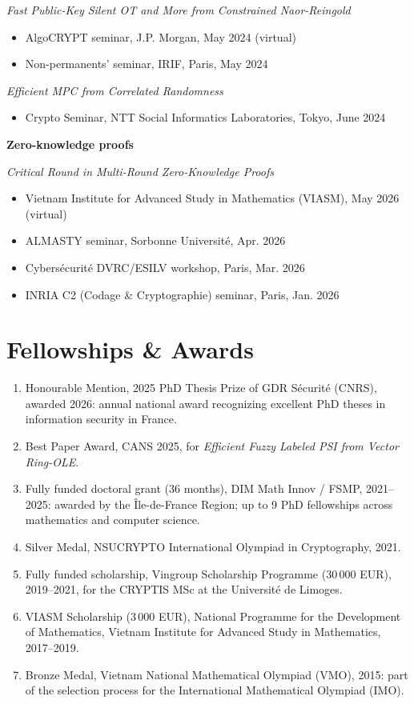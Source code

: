 \documentclass[11pt]{article}
\begin{document}
\smallskip
\emph{Fast Public-Key Silent OT and More from Constrained Naor-Reingold}
\begin{itemize}
      \item AlgoCRYPT seminar, J.P. Morgan, May 2024 (virtual)
      \item Non-permanents' seminar, IRIF, Paris, May 2024
\end{itemize}

\smallskip
\emph{Efficient MPC from Correlated Randomness}
\begin{itemize}
      \item Crypto Seminar, NTT Social Informatics Laboratories, Tokyo, June 2024
\end{itemize}

\medskip
\textbf{Zero-knowledge proofs}

\smallskip
\emph{Critical Round in Multi-Round Zero-Knowledge Proofs}
\begin{itemize}
      \item Vietnam Institute for Advanced Study in Mathematics (VIASM), May 2026 (virtual)
      \item ALMASTY seminar, Sorbonne Universit\'e, Apr. 2026
      \item Cybers\'ecurit\'e DVRC/ESILV workshop, Paris, Mar. 2026
      \item INRIA C2 (Codage \& Cryptographie) seminar, Paris, Jan. 2026
\end{itemize}

\section{Fellowships \& Awards}
\begin{enumerate}
      \item Honourable Mention, 2025 PhD Thesis Prize of GDR S\'ecurit\'e (CNRS), awarded 2026: annual national award recognizing excellent PhD theses in information security in France.
      \item Best Paper Award, CANS 2025, for \emph{Efficient Fuzzy Labeled PSI from Vector Ring-OLE}.
      \item Fully funded doctoral grant (36 months), DIM Math Innov / FSMP, 2021--2025: awarded by the \^Ile-de-France Region; up to 9 PhD fellowships across mathematics and computer science.
      \item Silver Medal, NSUCRYPTO International Olympiad in Cryptography, 2021.
      \item Fully funded scholarship, Vingroup Scholarship Programme (30\,000 EUR), 2019--2021, for the CRYPTIS MSc at the Universit\'e de Limoges.
      \item VIASM Scholarship (3\,000 EUR), National Programme for the Development of Mathematics, Vietnam Institute for Advanced Study in Mathematics, 2017--2019.
      \item Bronze Medal, Vietnam National Mathematical Olympiad (VMO), 2015: part of the selection process for the International Mathematical Olympiad (IMO).
\end{enumerate}
\end{document}
